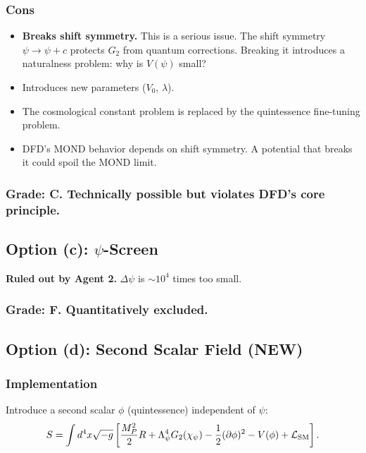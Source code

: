 \documentclass[11pt,a4paper]{article}
\begin{document}
\subsubsection{Cons}
\begin{itemize}
\item \textbf{Breaks shift symmetry.} This is a serious issue. The shift symmetry $\psi \to \psi + c$ protects $G_2$ from quantum corrections. Breaking it introduces a naturalness problem: why is $V(\psi)$ small?
\item Introduces new parameters ($V_0$, $\lambda$).
\item The cosmological constant problem is replaced by the quintessence fine-tuning problem.
\item DFD's MOND behavior depends on shift symmetry. A potential that breaks it could spoil the MOND limit.
\end{itemize}

\subsubsection{Grade: C. Technically possible but violates DFD's core principle.}

\subsection{Option (c): $\psi$-Screen}

\textbf{Ruled out by Agent 2.} $\Delta\psi$ is $\sim 10^4$ times too small.

\subsubsection{Grade: F. Quantitatively excluded.}

\subsection{Option (d): Second Scalar Field (NEW)}

\subsubsection{Implementation}

Introduce a second scalar $\phi$ (quintessence) independent of $\psi$:
\begin{equation}
S = \int d^4x\sqrt{-g}\left[\frac{M_P^2}{2}R + \Lambda_\psi^4 G_2(\chi_\psi) - \frac{1}{2}(\partial\phi)^2 - V(\phi) + \mathcal{L}_{\rm SM}\right].
\end{equation}
\end{document}
